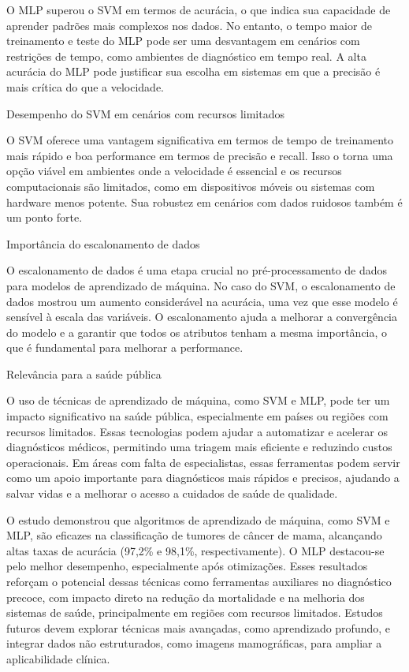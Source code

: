 \documentclass[12pt,a4paper,oneside,openany]{article}
\begin{document}
\noindent
O MLP superou o SVM em termos de acurácia, o que indica sua capacidade de aprender padrões mais complexos nos dados. No entanto, o tempo maior de treinamento e teste do MLP pode ser uma desvantagem em cenários com restrições de tempo, como ambientes de diagnóstico em tempo real. A alta acurácia do MLP pode justificar sua escolha em sistemas em que a precisão é mais crítica do que a velocidade.

\noindent
Desempenho do SVM em cenários com recursos limitados

\noindent
O SVM oferece uma vantagem significativa em termos de tempo de treinamento mais rápido e boa performance em termos de precisão e recall. Isso o torna uma opção viável em ambientes onde a velocidade é essencial e os recursos computacionais são limitados, como em dispositivos móveis ou sistemas com hardware menos potente. Sua robustez em cenários com dados ruidosos também é um ponto forte.

\noindent
Importância do escalonamento de dados

\noindent
O escalonamento de dados é uma etapa crucial no pré-processamento de dados para modelos de aprendizado de máquina. No caso do SVM, o escalonamento de dados mostrou um aumento considerável na acurácia, uma vez que esse modelo é sensível à escala das variáveis. O escalonamento ajuda a melhorar a convergência do modelo e a garantir que todos os atributos tenham a mesma importância, o que é fundamental para melhorar a performance.

\noindent
Relevância para a saúde pública

\noindent
O uso de técnicas de aprendizado de máquina, como SVM e MLP, pode ter um impacto significativo na saúde pública, especialmente em países ou regiões com recursos limitados. Essas tecnologias podem ajudar a automatizar e acelerar os diagnósticos médicos, permitindo uma triagem mais eficiente e reduzindo custos operacionais. Em áreas com falta de especialistas, essas ferramentas podem servir como um apoio importante para diagnósticos mais rápidos e precisos, ajudando a salvar vidas e a melhorar o acesso a cuidados de saúde de qualidade.

\noindent
O estudo demonstrou que algoritmos de aprendizado de máquina, como SVM e MLP, são eficazes na classificação de tumores de câncer de mama, alcançando altas taxas de acurácia (97,2\% e 98,1\%, respectivamente). O MLP destacou-se pelo melhor desempenho, especialmente após otimizações. Esses resultados reforçam o potencial dessas técnicas como ferramentas auxiliares no diagnóstico precoce, com impacto direto na redução da mortalidade e na melhoria dos sistemas de saúde, principalmente em regiões com recursos limitados. Estudos futuros devem explorar técnicas mais avançadas, como aprendizado profundo, e integrar dados não estruturados, como imagens mamográficas, para ampliar a aplicabilidade clínica.
\end{document}
